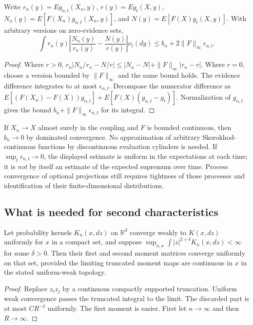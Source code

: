 \begin{theorem}
\label{thm:r33-c2-evidence}
Write $r_n(y)=E g_{n,t}(X_n,y)$, $r(y)=E g_t(X,y)$,
$N_n(y)=E[F(X_n)g_{n,t}(X_n,y)]$, and
$N(y)=E[F(X)g_t(X,y)]$.  With arbitrary versions on zero-evidence sets,
\[
 \int r_n(y)\left|\frac{N_n(y)}{r_n(y)}-
                         \frac{N(y)}{r(y)}\right|\nu_t(dy)
 \le b_n+2\|F\|_\infty\epsilon_{n,t}.
\]
\end{theorem}
\begin{proof}
Where $r>0$,
$r_n|N_n/r_n-N/r|\le|N_n-N|+\|F\|_\infty|r_n-r|$.
Where $r=0$, choose a version bounded by $\|F\|_\infty$ and the same bound
holds.  The evidence difference integrates to at most $\epsilon_{n,t}$.
Decompose the numerator difference as
$E[(F(X_n)-F(X))g_{n,t}]+E[F(X)(g_{n,t}-g_t)]$.
Normalization of $g_{n,t}$ gives the bound
$b_n+\|F\|_\infty\epsilon_{n,t}$ for its integral.
\end{proof}

If $X_n\to X$ almost surely in the coupling and $F$ is bounded continuous,
then $b_n\to0$ by dominated convergence.  No approximation of arbitrary
Skorokhod-continuous functions by discontinuous evaluation cylinders is
needed.  If $\sup_t\epsilon_{n,t}\to0$, the displayed estimate is uniform
in the expectations at each time; it is \emph{not} by itself an estimate of
the expected supremum over time.  Process convergence of optional projections
still requires tightness of those processes and identification of their
finite-dimensional distributions.

\subsection{What is needed for second characteristics}

\begin{lemma}
\label{lem:r33-c2-moments}
Let probability kernels $K_n(x,dz)$ on $\mathbb R^d$ converge weakly to
$K(x,dz)$ uniformly for $x$ in a compact set, and suppose
$\sup_{n,x}\int|z|^{2+\delta}K_n(x,dz)<\infty$ for some $\delta>0$.
Then their first and second moment matrices converge uniformly on that set,
provided the limiting truncated moment maps are continuous in $x$ in the
stated uniform-weak topology.
\end{lemma}
\begin{proof}
Replace $z_iz_j$ by a continuous compactly supported truncation.  Uniform
weak convergence passes the truncated integral to the limit.  The discarded
part is at most $CR^{-\delta}$ uniformly.  The first moment is easier.
First let $n\to\infty$ and then $R\to\infty$.
\end{proof}

